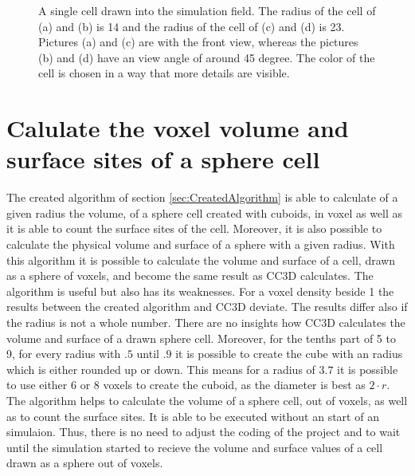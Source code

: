 \begin{figure}
\begin{center}
{	}
	\end{center}
	\caption{\label{img:DrawnSphereCellRadius14And23}A single cell drawn into the simulation field. The radius of the cell of (a) and (b) is 14 and the radius of the cell of (c) and (d) is 23. Pictures (a) and (c) are with the front view, whereas the
pictures (b) and (d) have an view angle of around 45 degree. The color of the cell is chosen in
a way that more details are visible.}
\end{figure}


\newpage
\section{Calulate the voxel volume and surface sites of a sphere cell}
The created algorithm of section \ref{sec:CreatedAlgorithm} is able to calculate of a given radius the volume, of a sphere cell created with cuboids, in voxel as well as it is able to count the surface sites of the cell. Moreover, it is also possible to calculate the physical volume and surface of a sphere with a given radius. With this algorithm it is possible to calculate the volume and surface of a cell, drawn as a sphere of voxels, and become the same result as \ac{CC3D} calculates. \newline
The algorithm is useful but also has its weaknesses. For a voxel density beside 1 the results between the created algorithm and \ac{CC3D} deviate. The results differ also if the radius is not a whole number. There are no insights how \ac{CC3D} calculates the volume and surface of a drawn sphere cell. Moreover, for the tenths part of 5 to 9, for every radius with $.5$ until $.9$ it is possible to create the cube with an radius which is either rounded up or down. This means for a radius of $3.7$ it is possible to use either 6 or 8 voxels to create the cuboid, as the diameter is best as $2 \cdot r$. \newline
The algorithm helps to calculate the volume of a sphere cell, out of voxels, as well as to count the surface sites. It is able to be executed without an start of an simulaion. Thus, there is no need to adjust the coding of the project and to wait until the simulation started to recieve the volume and surface values of a cell drawn as a sphere out of voxels. 


